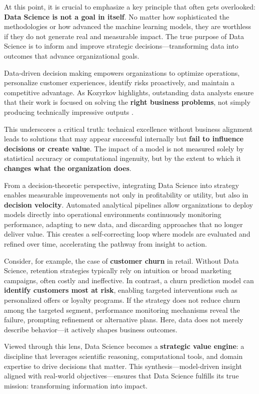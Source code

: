 \documentclass[
  12pt,
  letterpaper,
]{book}
\begin{document}
At this point, it is crucial to emphasize a key principle that often
gets overlooked: \textbf{Data Science is not a goal in itself}. No
matter how sophisticated the methodologies or how advanced the machine
learning models, they are worthless if they do not generate real and
measurable impact. The true purpose of Data Science is to inform and
improve strategic decisions---transforming data into outcomes that
advance organizational goals.

Data-driven decision making empowers organizations to optimize
operations, personalize customer experiences, identify risks
proactively, and maintain a competitive advantage. As Kozyrkov
highlights, outstanding data analysts ensure that their work is focused
on solving the \textbf{right business problems}, not simply producing
technically impressive outputs
.

This underscores a critical truth: technical excellence without business
alignment leads to solutions that may appear successful internally but
\textbf{fail to influence decisions or create value}. The impact of a
model is not measured solely by statistical accuracy or computational
ingenuity, but by the extent to which it \textbf{changes what the
organization does}.

From a decision-theoretic perspective, integrating Data Science into
strategy enables measurable improvements not only in profitability or
utility, but also in \textbf{decision velocity}. Automated analytical
pipelines allow organizations to deploy models directly into operational
environments continuously monitoring performance, adapting to new data,
and discarding approaches that no longer deliver value. This creates a
self-correcting loop where models are evaluated and refined over time,
accelerating the pathway from insight to action.

Consider, for example, the case of \textbf{customer churn} in retail.
Without Data Science, retention strategies typically rely on intuition
or broad marketing campaigns, often costly and ineffective. In contrast,
a churn prediction model can \textbf{identify customers most at risk},
enabling targeted interventions such as personalized offers or loyalty
programs. If the strategy does not reduce churn among the targeted
segment, performance monitoring mechanisms reveal the failure, prompting
refinement or alternative plans. Here, data does not merely describe
behavior---it actively shapes business outcomes.

Viewed through this lens, Data Science becomes a \textbf{strategic value
engine}: a discipline that leverages scientific reasoning, computational
tools, and domain expertise to drive decisions that matter. This
synthesis---model-driven insight aligned with real-world
objectives---ensures that Data Science fulfills its true mission:
transforming information into impact.
\end{document}
